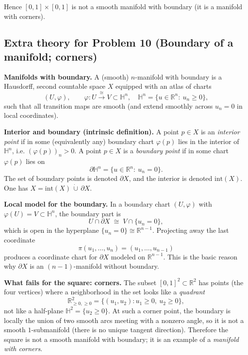 \documentclass[12pt,a4paper]{article}
\theoremstyle{plain}
\theoremstyle{definition}      %
\begin{document}
Hence $[0,1]\times[0,1]$ is not a smooth manifold with boundary (it is a manifold with corners).




\subsection*{Extra theory for Problem 10 (Boundary of a manifold; corners)}

\noindent\textbf{Manifolds with boundary.}
A (smooth) $n$-manifold with boundary is a Hausdorff, second countable space $X$
equipped with an atlas of charts
\[
(U,\varphi),\qquad \varphi:U\stackrel{\cong}{\longrightarrow} V\subset \mathbb{H}^n,
\quad
\mathbb{H}^n=\{u\in\mathbb{R}^n:\ u_n\ge 0\},
\]
such that all transition maps are smooth (and extend smoothly across $u_n=0$ in local coordinates).

\medskip
\noindent\textbf{Interior and boundary (intrinsic definition).}
A point $p\in X$ is an \emph{interior point} if in some (equivalently any) boundary chart
$\varphi(p)$ lies in the interior of $\mathbb{H}^n$, i.e. $(\varphi(p))_n>0$.
A point $p\in X$ is a \emph{boundary point} if in some chart $\varphi(p)$ lies on
\[
\partial\mathbb{H}^n=\{u\in\mathbb{R}^n:\ u_n=0\}.
\]
The set of boundary points is denoted $\partial X$, and the interior is denoted $\mathrm{int}(X)$.
One has $X=\mathrm{int}(X)\,\dot\cup\,\partial X$.

\medskip
\noindent\textbf{Local model for the boundary.}
In a boundary chart $(U,\varphi)$ with $\varphi(U)=V\subset\mathbb{H}^n$, the boundary part is
\[
U\cap\partial X \;\cong\; V\cap\{u_n=0\},
\]
which is open in the hyperplane $\{u_n=0\}\cong\mathbb{R}^{n-1}$.
Projecting away the last coordinate
\[
\pi(u_1,\dots,u_n)=(u_1,\dots,u_{n-1})
\]
produces a coordinate chart for $\partial X$ modeled on $\mathbb{R}^{n-1}$.
This is the basic reason why $\partial X$ is an $(n-1)$-manifold without boundary.

\medskip
\noindent\textbf{What fails for the square: corners.}
The subset $[0,1]^2\subset\mathbb{R}^2$ has points (the four vertices) where a neighborhood in the set
looks like a \emph{quadrant}
\[
\mathbb{R}^2_{\ge 0,\ge 0}=\{(u_1,u_2): u_1\ge 0,\ u_2\ge 0\},
\]
not like a half-plane $\mathbb{H}^2=\{u_2\ge 0\}$.
At such a corner point, the boundary is locally the union of two smooth arcs meeting with a nonzero angle,
so it is not a smooth $1$-submanifold (there is no unique tangent direction).
Therefore the square is not a smooth manifold with boundary; it is an example of a \emph{manifold with corners}.
\end{document}
